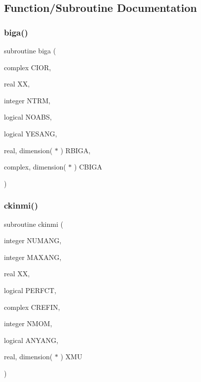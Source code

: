 \subsection{Function/\+Subroutine Documentation}
\mbox{\label{wiscombe__miev__1_2_m_i_e_v0no_p_8f_affcbe26d3e8beb59e07c207f2b0da43a}} 
\subsubsection{\texorpdfstring{biga()}{biga()}}
{\footnotesize\ttfamily subroutine biga (\begin{DoxyParamCaption}\item[{complex}]{C\+I\+OR,  }\item[{real}]{XX,  }\item[{integer}]{N\+T\+RM,  }\item[{logical}]{N\+O\+A\+BS,  }\item[{logical}]{Y\+E\+S\+A\+NG,  }\item[{real, dimension( $\ast$ )}]{R\+B\+I\+GA,  }\item[{complex, dimension( $\ast$ )}]{C\+B\+I\+GA }\end{DoxyParamCaption})}

\mbox{\label{wiscombe__miev__1_2_m_i_e_v0no_p_8f_a06fe91ee97b1295c97915feaad0d2e13}} 
\subsubsection{\texorpdfstring{ckinmi()}{ckinmi()}}
{\footnotesize\ttfamily subroutine ckinmi (\begin{DoxyParamCaption}\item[{integer}]{N\+U\+M\+A\+NG,  }\item[{integer}]{M\+A\+X\+A\+NG,  }\item[{real}]{XX,  }\item[{logical}]{P\+E\+R\+F\+CT,  }\item[{complex}]{C\+R\+E\+F\+IN,  }\item[{integer}]{N\+M\+OM,  }\item[{logical}]{A\+N\+Y\+A\+NG,  }\item[{real, dimension( $\ast$ )}]{X\+MU }\end{DoxyParamCaption})}

